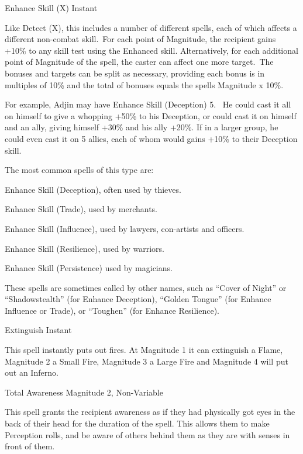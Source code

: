 \begin{rpg-spell}
{Enhance Skill (X)}
{Instant}

Like Detect (X), this includes a number of different spells, each of which affects a different non-combat skill. For each point of Magnitude, the recipient gains +10\% to any skill test using the Enhanced skill.  Alternatively, for each additional point of Magnitude of the spell, the caster can affect one more target. The bonuses and targets can be split as necessary, providing each bonus is in multiples of 10\% and the total of bonuses equals the spells Magnitude x 10\%.

For example, Adjin may have Enhance Skill (Deception) 5.  He could cast it all on himself to give a whopping +50\% to his Deception, or could cast it on himself and an ally, giving himself +30\% and his ally +20\%. If in a larger group, he could even cast it on 5 allies, each of whom would gains +10\% to their Deception skill.

The most common spells of this type are:
\begin{rpg-list}
\item Enhance Skill (Deception), often used by thieves.
\item Enhance Skill (Trade), used by merchants.
\item Enhance Skill (Influence), used by lawyers, con-artists and officers.
\item Enhance Skill (Resilience), used by warriors.
\item Enhance Skill (Persistence) used by magicians.
\end{rpg-list}

These spells are sometimes called by other names, such as “Cover of Night” or “Shadowstealth” (for Enhance Deception), “Golden Tongue” (for Enhance Influence or Trade), or “Toughen” (for Enhance Resilience).
\end{rpg-spell}


\begin{rpg-spell}
{Extinguish}
{Instant}

This spell instantly puts out fires. At Magnitude 1 it can extinguish a Flame, Magnitude 2 a Small Fire, Magnitude 3 a Large Fire and Magnitude 4 will put out an Inferno.
\end{rpg-spell}


\begin{rpg-spell}
{Total Awareness}
{Magnitude 2, Non-Variable}

This spell grants the recipient awareness as if they had physically got eyes in the back of their head for the duration of the spell. This allows them to make Perception rolls, and be aware of others behind them as they are with senses in front of them.
\end{rpg-spell}


